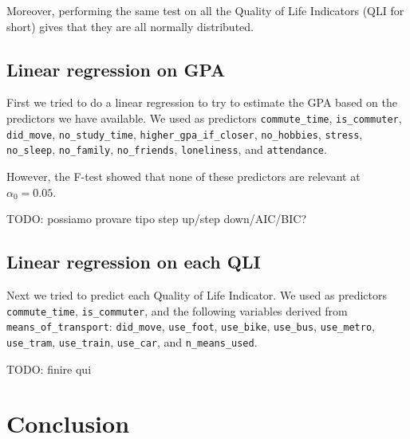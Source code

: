 \documentclass[12pt]{extarticle}
\numberwithin{table}{section}
\numberwithin{figure}{section}
\numberwithin{equation}{section}
\begin{document}
Moreover, performing the same test on all the Quality of Life Indicators (QLI for short)
gives that they are all normally distributed.

\subsection{Linear regression on GPA}

First we tried to do a linear regression to try to estimate the GPA based on the predictors we have available.
We used as predictors
\texttt{commute\_time},
\texttt{is\_commuter},
\texttt{did\_move},
\texttt{no\_study\_time},
\texttt{higher\_gpa\_if\_closer},
\texttt{no\_hobbies},
\texttt{stress},
\texttt{no\_sleep},
\texttt{no\_family},
\texttt{no\_friends},
\texttt{loneliness}, and
\texttt{attendance}.

However, the F-test showed that none of these predictors are relevant at $\alpha_0 = 0.05$.

TODO: possiamo provare tipo step up/step down/AIC/BIC?

\subsection{Linear regression on each QLI}

Next we tried to predict each Quality of Life Indicator.
We used as predictors
\texttt{commute\_time},
\texttt{is\_commuter}, and the following variables derived from \texttt{means\_of\_transport}:
\texttt{did\_move},
\texttt{use\_foot},
\texttt{use\_bike},
\texttt{use\_bus},
\texttt{use\_metro},
\texttt{use\_tram},
\texttt{use\_train},
\texttt{use\_car}, and
\texttt{n\_means\_used}.

TODO: finire qui

\section{Conclusion}
\end{document}
